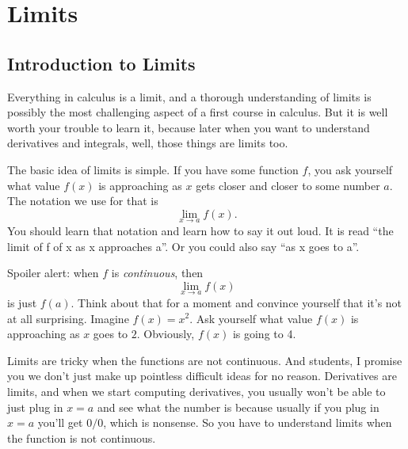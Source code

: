 \documentclass[11pt]{book}
\makeatletter
\newcommand{\hilight@DoHighlight}{
  \fill [ decoration = {random steps, amplitude=1pt, segment length=15pt}
        , outer sep = -15pt, inner sep = 0pt, decorate
        , every highlighter, this highlighter ]
        ($(begin highlight)+(0,8pt)$) rectangle ($(end highlight)+(0,-3pt)$) ;
}
\newcommand{\hilight@BeginHighlight}{
  \coordinate (begin highlight) at (0,0) ;
}
\newcommand{\hilight@EndHighlight}{
  \coordinate (end highlight) at (0,0) ;
}
\DeclareRobustCommand*\hilight[1][]{%
  \tikzset{this highlighter/.style={#1}}%
  \SOUL@setup
  \def\SOUL@preamble{%
    \begin{tikzpicture}[overlay, remember picture]
      \hilight@BeginHighlight
      \hilight@EndHighlight
    \end{tikzpicture}%
  }%
  \def\SOUL@postamble{%
    \begin{tikzpicture}[overlay, remember picture]
      \hilight@EndHighlight
      \hilight@DoHighlight
    \end{tikzpicture}%
  }%
  \def\SOUL@everyhyphen{%
    \discretionary{%
      \SOUL@setkern\SOUL@hyphkern
      \SOUL@sethyphenchar
      \tikz[overlay, remember picture] \hilight@EndHighlight ;%
    }{%
    }{%
      \SOUL@setkern\SOUL@charkern
    }%
  }%
  \def\SOUL@everyexhyphen##1{%
    \SOUL@setkern\SOUL@hyphkern
    \hbox{##1}%
    \discretionary{%
      \tikz[overlay, remember picture] \hilight@EndHighlight ;%
    }{%
    }{%
      \SOUL@setkern\SOUL@charkern
    }%
  }%
  \def\SOUL@everysyllable{%
    \begin{tikzpicture}[overlay, remember picture]
      \path let \p0 = (begin highlight), \p1 = (0,0) in \pgfextra
        \global\hilight@previous=\y0
        \global\hilight@current =\y1
      \endpgfextra (0,0) ;
      \ifdim\hilight@current < \hilight@previous
        \hilight@DoHighlight
        \hilight@BeginHighlight
      \fi
    \end{tikzpicture}%
    \the\SOUL@syllable
    \tikz[overlay, remember picture] \hilight@EndHighlight ;%
  }%
  \SOUL@
}
\numberwithin{example}{chapter}
\makeatother
\begin{document}
\chapter{Limits}     

\section{Introduction to Limits}

Everything in calculus is a limit, and a thorough understanding of limits is possibly the most challenging aspect of a first course in calculus.  But it is well worth your trouble to learn it, because later when you want to understand derivatives and integrals, well, those things are limits too.  

The basic idea of limits is simple.  If you have some function $f$, you ask yourself what value $f(x)$ is approaching as $x$ gets closer and closer to some number $a$.  The notation we use for that is $$\lim_{x\to a} f(x).$$  You should learn that notation and learn how to say it out loud.  It is read ``the limit of f of x as x approaches a''.  Or you could also say ``as x goes to a''.  

Spoiler alert: when $f$ is \emph{continuous}, then $$\lim_{x\to a} f(x)$$ is just $f(a)$.  Think about that for a moment and convince yourself that it's not at all surprising.  Imagine $f(x)=x^2$.  Ask yourself what value $f(x)$ is approaching as $x$ goes to $2$.  Obviously, $f(x)$ is going to 4.

Limits are tricky when the functions are not continuous.  And students, I promise you we don't just make up pointless difficult ideas for no reason.  Derivatives are limits, and when we start computing derivatives, you usually won't be able to just plug in $x=a$ and see what the number is because usually if you plug in $x=a$ you'll get $0/0$, which is nonsense.  So you have to understand limits when the function \hilight{is not continuous}.
\end{document}
